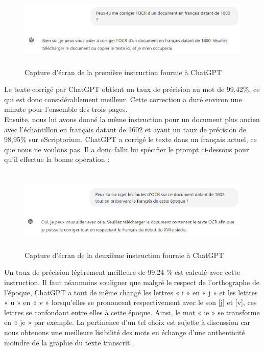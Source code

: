 \documentclass[a4paper,12pt,twoside]{book}
\begin{document}
\begin{figure} [H]
	\includegraphics[width=6.26806in,height=1.45833in]{vertopal_157ae480aa4a4b07be198b586a812241/media/image16.png}
	\caption{Capture d'écran de la première instruction fournie à ChatGPT}
\end{figure}


Le texte corrigé par ChatGPT obtient un taux de précision au mot de
99,42\%, ce qui est donc considérablement meilleur. Cette correction a
duré environ une minute pour l'ensemble des trois pages. \\

Ensuite, nous lui avons donné la même instruction pour un document plus
ancien avec l'échantillon en français datant de 1602 et ayant un taux de
précision de 98,95\% sur eScriptorium. ChatGPT a corrigé le texte dans
un français actuel, ce que nous ne voulons pas. Il a donc fallu lui
spécifier le prompt ci-dessous pour qu'il effectue la bonne opération : \\

\begin{figure} [H]
	\includegraphics[width=6.26806in,height=1.55556in]{vertopal_157ae480aa4a4b07be198b586a812241/media/image17.png}
	\caption{Capture d'écran de la deuxième instruction fournie à ChatGPT}
\end{figure}


Un taux de précision légèrement meilleure de 99,24 \% est calculé avec
cette instruction. Il faut néanmoins souligner que malgré le respect de
l'orthographe de l'époque, ChatGPT a tout de même changé les lettres « i
» en « j » et les lettres « u » en « v » lorsqu'elles se prononcent
respectivement avec le son {[}j{]} et {[}v{]}, ces lettres se confondant
entre elles à cette époque. Ainsi, le mot « ie » se transforme en « je »
par exemple. La pertinence d'un tel choix est sujette à discussion car
nous obtenons une meilleure lisibilité des mots en échange d'une
authenticité moindre de la graphie du texte transcrit. \\
\end{document}
